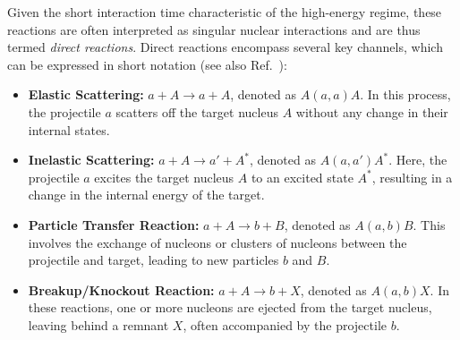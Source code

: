 Given the short interaction time characteristic of the high-energy regime, these reactions are often interpreted as singular nuclear interactions and are thus termed \textit{direct reactions}. Direct reactions encompass several key channels, which can be expressed in short notation (see also Ref.~\cite{obertelli2021modern}):
\begin{itemize}
    \item \textbf{Elastic Scattering:} $a + A \rightarrow a + A$, denoted as $A(a, a)A$. In this process, the projectile $a$ scatters off the target nucleus $A$ without any change in their internal states.
    \item \textbf{Inelastic Scattering:} $a + A \rightarrow a' + A^*$, denoted as $A(a, a')A^*$. Here, the projectile $a$ excites the target nucleus $A$ to an excited state $A^*$, resulting in a change in the internal energy of the target.
    \item \textbf{Particle Transfer Reaction:} $a + A \rightarrow b + B$, denoted as $A(a, b)B$. This involves the exchange of nucleons or clusters of nucleons between the projectile and target, leading to new particles $b$ and $B$.
    \item \textbf{Breakup/Knockout Reaction:} $a + A \rightarrow b + X$, denoted as $A(a, b)X$. In these reactions, one or more nucleons are ejected from the target nucleus, leaving behind a remnant $X$, often accompanied by the projectile $b$.
\end{itemize}

